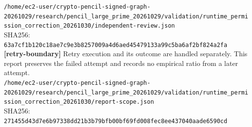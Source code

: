 \documentclass[11pt]{article}
\begin{document}
\texttt{/\allowbreak{}home/\allowbreak{}ec2-user/\allowbreak{}crypto-pencil-signed-graph-20261029/\allowbreak{}research/\allowbreak{}pencil\_large\_prime\_20261029/\allowbreak{}validation/\allowbreak{}runtime\_permission\_correction\_20261030/\allowbreak{}independent-review.json}\\
SHA256: \texttt{63a7cf1b120c18ae7c9e3b8257009a4d6aed45479133a99c5ba6af2bf824a2fa}\\
\textbf{[retry-boundary]} Retry execution and its outcome are handled separately. This report preserves the failed attempt and records no empirical ratio from a later attempt.\\
\texttt{/\allowbreak{}home/\allowbreak{}ec2-user/\allowbreak{}crypto-pencil-signed-graph-20261029/\allowbreak{}research/\allowbreak{}pencil\_large\_prime\_20261029/\allowbreak{}validation/\allowbreak{}runtime\_permission\_correction\_20261030/\allowbreak{}report-scope.json}\\
SHA256: \texttt{271455d43d7e6b97338dd21b3b79bfb00bf69fd008fec8ee437040aade6590cd}\\
\end{document}
